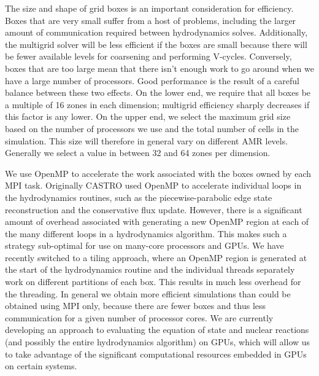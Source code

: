 \documentclass[iop]{emulateapj}
\begin{document}
The size and shape of grid boxes is an important consideration for efficiency. 
Boxes that are very small suffer from a host of problems, including the larger 
amount of communication required between hydrodynamics solves. Additionally, 
the multigrid solver will be less efficient if the boxes are small because there 
will be fewer available levels for coarsening and performing V-cycles. Conversely, 
boxes that are too large mean that there isn't enough work to go around when we 
have a large number of processors. Good performance is the result of a careful 
balance between these two effects. On the lower end, we require that all boxes 
be a multiple of 16 zones in each dimension; multigrid efficiency sharply decreases 
if this factor is any lower. On the upper end, we select the maximum grid size 
based on the number of processors we use and the total number of cells in the 
simulation. This size will therefore in general vary on different AMR levels. 
Generally we select a value in between 32 and 64 zones per dimension.

We use OpenMP to accelerate the work associated with the boxes owned by each 
MPI task. Originally CASTRO used OpenMP to accelerate individual loops in the 
hydrodynamics routines, such as the piecewise-parabolic edge state reconstruction 
and the conservative flux update. However, there is a significant amount of 
overhead associated with generating a new OpenMP region at each of the many 
different loops in a hydrodynamics algorithm. This makes such a strategy 
sub-optimal for use on many-core processors and GPUs. We have recently switched 
to a tiling approach, where an OpenMP region is generated at the start of 
the hydrodynamics routine and the individual threads separately work on 
different partitions of each box. This results in much less overhead for 
the threading. In general we obtain more efficient simulations than 
could be obtained using MPI only, because there are fewer boxes and thus 
less communication for a given number of processor cores. We are currently 
developing an approach to evaluating the equation of state and nuclear reactions 
(and possibly the entire hydrodynamics algorithm) on GPUs, which will allow us
to take advantage of the significant computational resources embedded in GPUs on 
certain systems.
\end{document}

